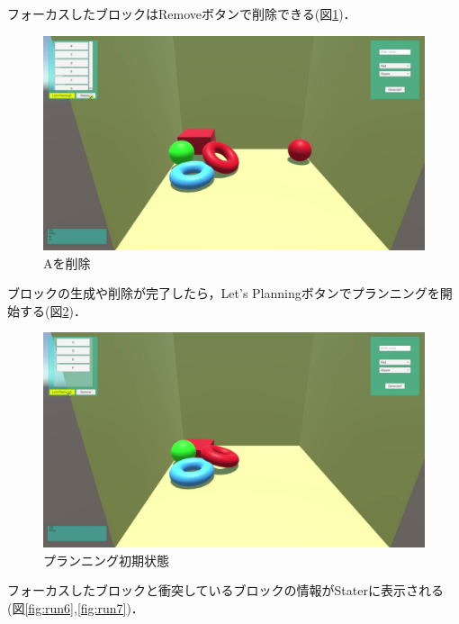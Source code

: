 \documentclass[12pt]{jarticle}
\begin{document}
フォーカスしたブロックはRemoveボタンで削除できる(図\ref{fig:run4})．

\begin{figure}[!hbt]
  	\begin{center}
  		\includegraphics[scale=0.2]{images/BWP_Work6/bwp6.jpg}
	\end{center}
  	\caption{Aを削除}
  	\label{fig:run4}
\end{figure}
\clearpage

ブロックの生成や削除が完了したら，Let's Planningボタンでプランニングを開始する(図\ref{fig:run5})．

\begin{figure}[!hbt]
  	\begin{center}
  		\includegraphics[scale=0.2]{images/BWP_Work6/bwp7.jpg}
	\end{center}
  	\caption{プランニング初期状態}
  	\label{fig:run5}
\end{figure}
\clearpage

フォーカスしたブロックと衝突しているブロックの情報がStaterに表示される(図\ref{fig:run6},\ref{fig:run7})．
\end{document}
